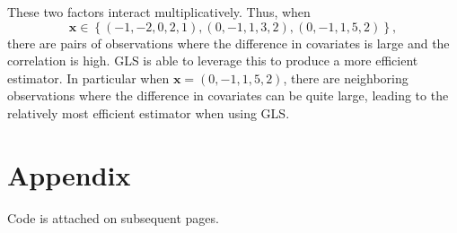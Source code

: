 \documentclass[11pt, letterpaper]{article}
\begin{document}
\begin{enumerate}[(a)]
\begin{description}
  These two factors interact multiplicatively. Thus, when
  \[\mathbf{x} \in \left\{ (-1,-2,0,2,1), (0,-1,1,3,2), (0,-1,1,5,2) \right\},\]
  there are pairs of observations where the difference in covariates is large
  and the correlation is high. GLS is able to leverage this to produce a more
  efficient estimator. In particular when $\mathbf{x} = (0,-1,1,5,2)$, there are
  neighboring observations where the difference in covariates can be quite
  large, leading to the relatively most efficient estimator when using GLS.
\end{description}
\end{enumerate}

\section*{Appendix}

Code is attached on subsequent pages.

\clearpage



\end{document}
